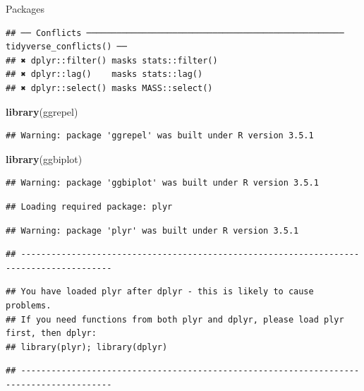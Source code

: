\documentclass[ignorenonframetext,]{beamer}
\newenvironment{Shaded}{\begin{snugshade}}{\end{snugshade}}
\newcommand{\KeywordTok}[1]{\textcolor[rgb]{0.13,0.29,0.53}{\textbf{#1}}}
\newcommand{\NormalTok}[1]{#1}
\begin{document}
\begin{frame}[fragile]{Packages}
\begin{verbatim}
## ── Conflicts ─────────────────────────────────────────────────── tidyverse_conflicts() ──
## ✖ dplyr::filter() masks stats::filter()
## ✖ dplyr::lag()    masks stats::lag()
## ✖ dplyr::select() masks MASS::select()
\end{verbatim}

\begin{Shaded}
\begin{Highlighting}[]
\KeywordTok{library}\NormalTok{(ggrepel)}
\end{Highlighting}
\end{Shaded}

\begin{verbatim}
## Warning: package 'ggrepel' was built under R version 3.5.1
\end{verbatim}

\begin{Shaded}
\begin{Highlighting}[]
\KeywordTok{library}\NormalTok{(ggbiplot)}
\end{Highlighting}
\end{Shaded}

\begin{verbatim}
## Warning: package 'ggbiplot' was built under R version 3.5.1
\end{verbatim}

\begin{verbatim}
## Loading required package: plyr
\end{verbatim}

\begin{verbatim}
## Warning: package 'plyr' was built under R version 3.5.1
\end{verbatim}

\begin{verbatim}
## ----------------------------------------------------------------------------------------
\end{verbatim}

\begin{verbatim}
## You have loaded plyr after dplyr - this is likely to cause problems.
## If you need functions from both plyr and dplyr, please load plyr first, then dplyr:
## library(plyr); library(dplyr)
\end{verbatim}

\begin{verbatim}
## ----------------------------------------------------------------------------------------
\end{verbatim}


\end{frame}
\end{document}
